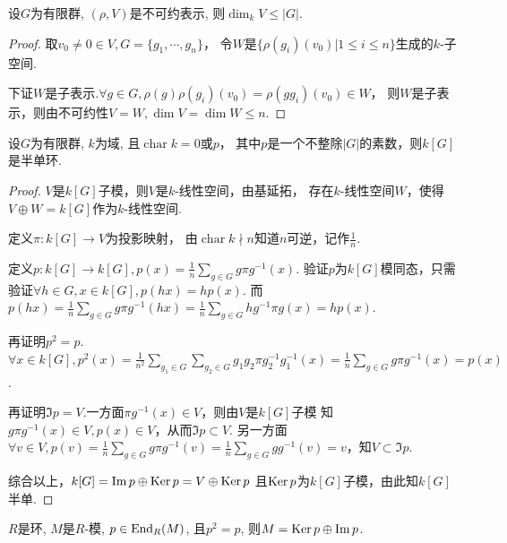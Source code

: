 \begin{proposition}
    设$G$为有限群, $(\rho,V)$是不可约表示, 则$\dim_k V\leq |G|$.
\end{proposition}
\begin{proof}
	取$v_0\neq 0\in V ,G=\{g_1,\cdots,g_n\}$，
    令$W$是$\{\rho(g_i)(v_0)|1\leq i\leq n\}$生成的$k$-子空间.
	
	下证$W$是子表示.$\forall g \in G,\rho(g)\rho(g_i)(v_0)=\rho(gg_i)(v_0)\in W$，
    则$W$是子表示，则由不可约性$V=W,\dim V=\dim W\leq n$.
\end{proof}
\begin{theorem} [Maschke]\par
    \qquad 设$G$为有限群, $k$为域, 且$\operatorname{char} k=0$或$p$，
    其中$p$是一个不整除$|G|$的素数，则$k[G]$是半单环.

\end{theorem}
\begin{proof}
	$V$是$k[G]$子模，则$V$是$k$-线性空间，由基延拓，
    存在$k$-线性空间$W$，使得$V\oplus W=k[G]$作为$k$-线性空间.
	
	定义$\pi :k[G]\rightarrow V$为投影映射，
    由$\operatorname{char}k \nmid n$知道$n$可逆，记作$\frac{1}{n}$.
	
	定义$p:k[G]\rightarrow k[G],p(x)=\frac{1}{n}\sum_{g\in G} g\pi g^{-1}(x)$.
	验证$p$为$k[G]$模同态，只需验证$\forall h\in G,x\in k[G],p(hx)=hp(x).$
	而$p(hx)=\frac{1}{n}\sum_{g\in G} g\pi g^{-1}(hx)
    =\frac{1}{n}\sum_{g\in G} hg^{-1}\pi g(x)=hp(x).$
	
	再证明$p^2=p$.$\forall x \in k[G],p^2(x)
    =\frac{1}{n^2}\sum_{g_1\in G} \sum_{g_2\in G} g_1g_2\pi g_2^{-1}g_1^{-1}(x)
    =\frac{1}{n}\sum_{g\in G} g\pi g^{-1}(x)=p(x)$.
	
	再证明$\Im p=V.$一方面$\pi g^{-1}(x)\in V$，则由$V$是$k[G]$子模
    知$g\pi g^{-1}(x)\in V,p(x)\in V$，从而$\Im p \subset V$.
    另一方面$\forall v\in V,p(v)=\frac{1}{n}\sum_{g\in G} g\pi g^{-1}(v)
    =\frac{1}{n}\sum_{g\in G} g g^{-1}(v)=v$，知$V\subset \Im p$.
	
	综合以上，$k[G]=\operatorname{Im} p\oplus \operatorname{Ker} p=V\oplus \operatorname{Ker} p$
    且$ \operatorname{Ker} p $为$k[G]$子模，由此知$k[G]$半单.
\end{proof}
\begin{lemma}
    $R$是环, $M$是$R$-模, $p\in \operatorname{End}_R(M)$, 且$p^2=p$, 
    则$M=\operatorname{Ker} p\oplus \operatorname{Im} p$.
\end{lemma}

